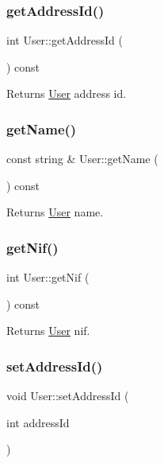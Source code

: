 \subsubsection{\texorpdfstring{get\+Address\+Id()}{getAddressId()}}
{\footnotesize\ttfamily int User\+::get\+Address\+Id (\begin{DoxyParamCaption}{ }\end{DoxyParamCaption}) const}

\begin{DoxyReturn}{Returns}
\hyperlink{class_user}{User} address id. 
\end{DoxyReturn}
\mbox{\label{class_user_ab5cb41f37a4f2d10c02a38aaeb130a8d}} 
\subsubsection{\texorpdfstring{get\+Name()}{getName()}}
{\footnotesize\ttfamily const string \& User\+::get\+Name (\begin{DoxyParamCaption}{ }\end{DoxyParamCaption}) const}

\begin{DoxyReturn}{Returns}
\hyperlink{class_user}{User} name. 
\end{DoxyReturn}
\mbox{\label{class_user_aace9e5f20472601ce1e937b1bf92d707}} 
\subsubsection{\texorpdfstring{get\+Nif()}{getNif()}}
{\footnotesize\ttfamily int User\+::get\+Nif (\begin{DoxyParamCaption}{ }\end{DoxyParamCaption}) const}

\begin{DoxyReturn}{Returns}
\hyperlink{class_user}{User} nif. 
\end{DoxyReturn}
\mbox{\label{class_user_a45fd50444975eb216feb4edd5ad1182e}} 
\subsubsection{\texorpdfstring{set\+Address\+Id()}{setAddressId()}}
{\footnotesize\ttfamily void User\+::set\+Address\+Id (\begin{DoxyParamCaption}\item[{int}]{address\+Id }\end{DoxyParamCaption})}


